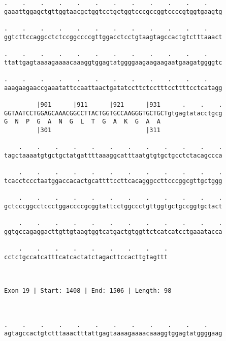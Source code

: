 \documentclass{article}
\begin{document}
\begin{Verbatim}
.    .    .    .    .    .    .    .    .    .    .    .    
gaaattggagctgttggtaacgctggtcctgctggtcccgccggtccccgtggtgaagtg
                                                            
.    .    .    .    .    .    .    .    .    .    .    .    
ggtcttccaggcctctccggccccgttggacctcctgtaagtagccactgtctttaaact
                                                            
.    .    .    .    .    .    .    .    .    .    .    .    
ttattgagtaaaagaaaacaaaggtggagtatggggaagaagaagaatgaagatggggtc
                                                            
.    .    .    .    .    .    .    .    .    .    .    .    
aaagaagaaccgaaatattccaattaactgatatccttctcctttccttttcctcatagg
                                                            
         |901      |911      |921      |931      .    .    .
GGTAATCCTGGAGCAAACGGCCTTACTGGTGCCAAGGGTGCTGCTgtgagtatacctgcg
G  N  P  G  A  N  G  L  T  G  A  K  G  A  A                 
         |301                          |311                 
  
    .    .    .    .    .    .    .    .    .    .    .    .
tagctaaaatgtgctgctatgattttaaaggcatttaatgtgtgctgcctctacagccca
                                                            
    .    .    .    .    .    .    .    .    .    .    .    .
tcacctccctaatggaccacactgcattttccttcacagggccttcccggcgttgctggg
                                                            
    .    .    .    .    .    .    .    .    .    .    .    .
gctcccggcctccctggaccccgcggtattcctggccctgttggtgctgccggtgctact
                                                            
    .    .    .    .    .    .    .    .    .    .    .    .
ggtgccagaggacttgttgtaagtggtcatgactgtggttctcatcatcctgaaatacca
                                                            
    .    .    .    .    .    .    .    .    .
cctctgccatcatttcatcactatctagacttccacttgtagttt
                                             
                                             
 
Exon 19 | Start: 1408 | End: 1506 | Length: 98



.    .    .    .    .    .    .    .    .    .    .    .    
agtagccactgtctttaaactttattgagtaaaagaaaacaaaggtggagtatggggaag
                                                            

\end{Verbatim}
\end{document}
